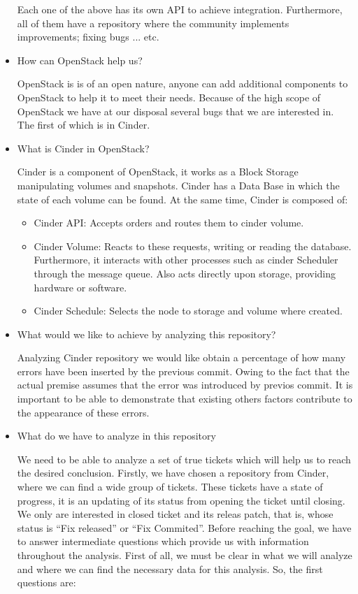 \documentclass[a4paper]{article}
\begin{document}
\begin{itemize}
Each one of the above has its own API to achieve integration. Furthermore, all of them have a repository where the community implements improvements; fixing bugs ... etc.


\item How can OpenStack help us?

OpenStack is is of an open nature, anyone can add additional components to OpenStack to help it to meet their needs. Because of the high scope of OpenStack we have at our disposal several bugs that we are interested in. The first of which is in Cinder. 

\item What is Cinder in OpenStack?

Cinder is a component of OpenStack, it works as a Block Storage manipulating volumes and snapshots. Cinder has a Data Base in which the state of each volume can be found.
At the same time, Cinder is composed of:

\begin{itemize}
    \item Cinder API: Accepts orders and routes them to cinder volume.
    \item Cinder Volume: Reacts to these requests, writing or reading the database. Furthermore, it interacts with other processes such as cinder Scheduler through the message queue. Also acts directly upon storage, providing hardware or software.
    \item Cinder Schedule: Selects the node to storage and volume where created.
\end{itemize}

\item What would we like to achieve by analyzing this repository?

Analyzing Cinder repository we would like obtain a percentage of how many errors have been inserted by the previous commit. Owing to the fact that the actual premise assumes that the error was introduced by previos commit.
It is important to be able to demonstrate that existing others factors contribute to the appearance of these errors. 

\item What do we have to analyze in this repository

We need to be able to analyze a set of true tickets which will help us to reach the desired conclusion. Firstly, we have chosen a repository from Cinder, where we can find a wide group of tickets. These tickets have a state of progress, it is an updating of its status from opening the ticket until closing.  We only are interested in closed ticket and its releas patch,  that is, whose status is “Fix released” or “Fix Commited”.
Before reaching the goal, we have to answer intermediate questions which provide us with information throughout the analysis. 
First of all, we must be clear in what we will analyze and where we can find the necessary data for this analysis. So, the first questions are:



\end{itemize}
\end{document}

